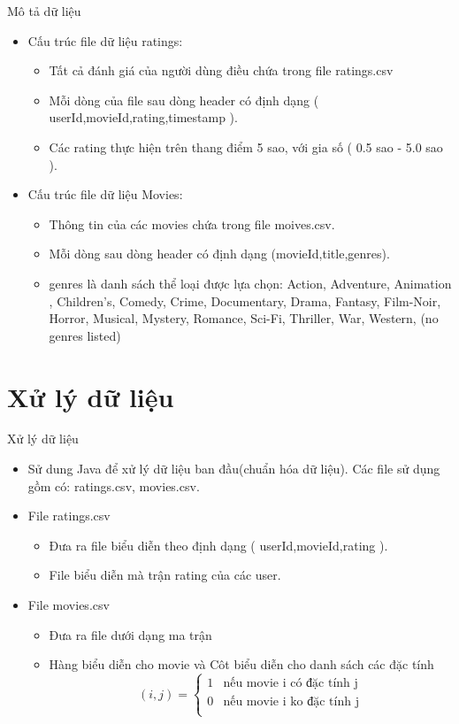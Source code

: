\documentclass{beamer}
\newcommand{\bi}{\begin{itemize}}
\newcommand{\ei}{\end{itemize}}
\begin{document}
\begin{frame}{Mô tả dữ liệu}
\bi
\item Cấu trúc file dữ liệu ratings:
\bi
\item Tất cả đánh giá của người dùng điều chứa trong file ratings.csv
\item Mỗi dòng của file sau dòng header có định dạng ( userId,movieId,rating,timestamp ).
\item Các rating thực hiện trên thang điểm 5 sao, với gia số ( 0.5 sao - 5.0 sao ).
\ei
\item Cấu trúc file dữ liệu Movies:
\bi
\item Thông tin của các movies chứa trong file moives.csv.
\item Mỗi dòng sau dòng header có định dạng (movieId,title,genres).
\item genres là danh sách thể loại được lựa chọn: Action, Adventure, Animation , Children's, Comedy, Crime, Documentary, Drama, Fantasy, Film-Noir, Horror, Musical, Mystery, Romance, Sci-Fi, Thriller, War, Western, (no genres listed)
\ei
\ei
\end{frame}

\section{Xử lý dữ liệu}
\begin{frame}{Xử lý dữ liệu}
\begin{itemize}
\item Sử dung Java để xử lý dữ liệu ban đầu(chuẩn hóa dữ liệu). Các file sử dụng gồm có: ratings.csv, movies.csv.
\item File ratings.csv
\bi 
\item Đưa ra file biểu diễn theo định dạng ( userId,movieId,rating ). 
\item File biểu diễn mà trận rating của các user.
\ei
\item File movies.csv
\bi
\item Đưa ra file dưới dạng ma trận
\item Hàng biểu diễn cho movie và Côt biểu diễn cho danh sách các đặc tính  
\begin{displaymath}
(i,j) = \left\{ \begin{array}{ll}
1 & \textrm{nếu movie i có đặc tính j}\\
0 & \textrm{nếu movie i ko đặc tính j}\\
\end{array} \right.
\end{displaymath}
\ei
\end{itemize} 
\end{frame}
\end{document}
